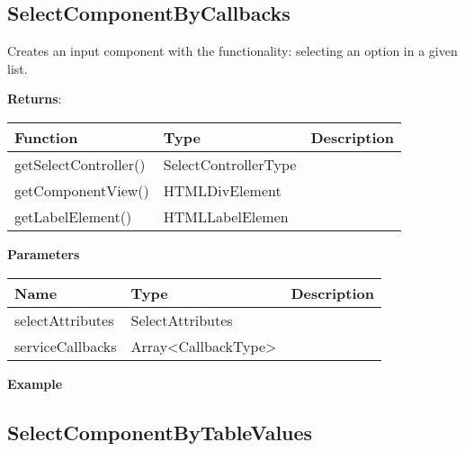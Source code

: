 \vspace*{6pt}
\subsection*{SelectComponentByCallbacks}

\vspace*{6pt}
Creates an input component with the functionality: selecting an option in a given list. 

\vspace*{18pt}
\noindent
\textbf{Returns}: 

\begin{table}[!htb] 
    \label{api:selectComponentByCallbacksReturn}
    \footnotesize
    \setlength\extrarowheight{4pt}
    \begin{tabular}{ p{3.5cm} p{3.5cm} p{6cm} }
        \toprule[1.2pt]
        \textbf{Function}     & \textbf{Type}        & \textbf{Description} \\
        \midrule
        getSelectController() & SelectControllerType &  \\
        getComponentView()    & HTMLDivElement       &  \\
        getLabelElement()     & HTMLLabelElemen      &  \\
        \bottomrule[1.2pt]
    \end{tabular}
\end{table}

\vspace*{6pt}
\noindent
\textbf{Parameters}

\begin{table}[!htb] 
    \label{api:selectComponentByCallbacksParameter}
    \footnotesize
    \setlength\extrarowheight{4pt}
    \begin{tabular}{ p{3.5cm} p{3.5cm} p{6cm} }
        \toprule[1.2pt]
        \textbf{Name}    & \textbf{Type}       & \textbf{Description} \\
        \midrule
        selectAttributes & SelectAttributes    &  \\
        serviceCallbacks & Array<CallbackType> &  \\
        \bottomrule[1.2pt]
    \end{tabular}
\end{table}

\vspace*{6pt}
\noindent
\textbf{Example}


\clearpage
\subsection*{SelectComponentByTableValues}

